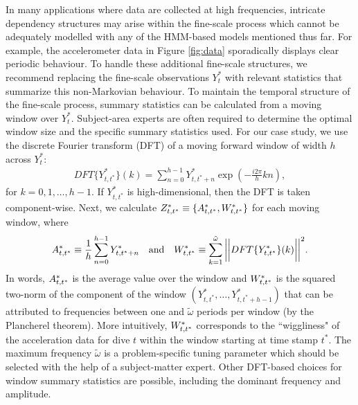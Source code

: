 In many applications where data are collected at high frequencies, intricate dependency structures may arise within the fine-scale process which cannot be adequately modelled with any of the HMM-based models mentioned thus far. For example, the accelerometer data in Figure \ref{fig:data} sporadically displays clear periodic behaviour. To handle these additional fine-scale structures, we recommend replacing the fine-scale observations $Y_t^*$ with relevant statistics that summarize this non-Markovian behaviour. To maintain the temporal structure of the fine-scale process, summary statistics can be calculated from a moving window over $Y_t^*$. Subject-area experts are often required to determine the optimal window size and the specific summary statistics used. For our case study, we use the discrete Fourier transform (DFT) of a moving forward window of width $h$ across $Y^*_t$:
%
\begin{align*}
    DFT\{Y^*_{t,t^*}\}(k) = \sum_{n=0}^{h-1} Y^*_{t,t^*+n}\exp\left(-\frac{i 2\pi}{h} kn \right),
\end{align*}
%
for $k = 0, 1, \ldots, h-1$. If $Y^*_{t,t^*}$ is high-dimensional, then the DFT is taken component-wise. Next, we calculate $Z^*_{t,t^*} \equiv \{A^*_{t,t^*},W^*_{t,t^*}\}$ for each moving window, where
%
\begin{equation}
    \label{eqn:z}
    \Zone_{t,t^*} \equiv \frac{1}{h}\sum_{n=0}^{h-1}Y^*_{t,t^*+n} \quad \text{and} \quad \Ztwo_{t,t^*} \equiv \sum_{k=1}^{\tilde{\omega}}\bigg|\bigg|DFT\{Y^*_{t,t^*}\}(k)\bigg|\bigg|^2.
\end{equation}
%
In words, $A^*_{t,t^*}$ is the average value over the window and $W^*_{t,t^*}$ is the squared two-norm of the component of the window $\left(Y^*_{t,t^*}, \ldots, Y^*_{t,t^*+h-1}\right)$ that can be attributed to frequencies between one and $\tilde{\omega}$ periods per window (by the Plancherel theorem). More intuitively, $W^*_{t,t^*}$ corresponds to the ``wiggliness" of the acceleration data for dive $t$ within the window starting at time stamp $t^*$. The maximum frequency $\tilde{\omega}$ is a problem-specific tuning parameter which should be selected with the help of a subject-matter expert. Other DFT-based choices for window summary statistics are possible, including the dominant frequency and amplitude.

